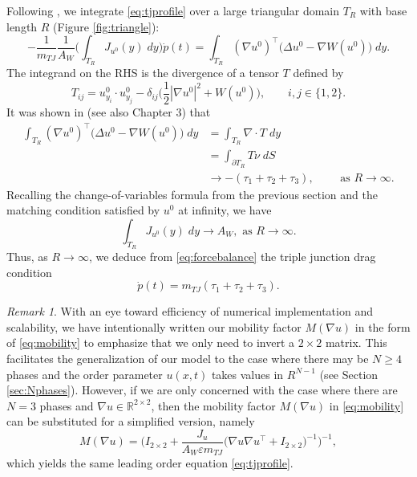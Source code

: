 \documentclass{article}
\theoremstyle{plain}
\theoremstyle{definition}
\theoremstyle{remark}
\newtheorem{remark}[theorem]{Remark}
\newcommand{\R}{\mathbb{R}}
\newcommand{\eps}{\varepsilon}
\begin{document}
Following \cite{bronsardreitich}, we integrate \eqref{eq:tjprofile} over a large triangular domain $T_R$ with base length $R$ (Figure \ref{fig:triangle}):
\begin{equation}\label{eq:forcebalance}
     -\frac{1}{m_{TJ}}\frac{1}{A_W}\bigg(\int_{T_R} J_{u^0}(y)\;dy\bigg) \dot{p}(t) = \int_{T_R}(\nabla u^0)^\top \big(\Delta u^0 - \nabla W(u^0)\big) \; dy.
\end{equation}
The integrand on the RHS is the divergence of a tensor $T$ defined by
\begin{equation}
    T_{ij} = u^0_{y_i} \cdot u^0_{y_j} - \delta_{ij}\bigg(\frac{1}{2}|\nabla u^0|^2 + W(u^0)\bigg), \qquad i,j \in \{1,2\}.
\end{equation}
It was shown in \cite{bronsardreitich} (see also \cite{alikakos2018elliptic} Chapter 3) that 
\begin{equation}
\begin{split}
    \int_{T_R}(\nabla u^0)^\top \big(\Delta u^0 - \nabla W(u^0)\big) \; dy &= \int_{T_R} \nabla\cdot T \; dy \\
    &= \int_{\partial T_R} T\nu \; dS\\
    &\to -(\tau_1 + \tau_2 + \tau_3) , \qquad \text{ as }R \to \infty.
\end{split}
\end{equation}
Recalling the change-of-variables formula from the previous section and the matching condition satisfied by $u^0$ at infinity, we have
\begin{equation}
    \int_{T_R} J_{u^0}(y)\;dy \to A_W, \text{ as } R\to\infty.
\end{equation}
Thus, as $R \to \infty$, we deduce from \eqref{eq:forcebalance} the triple junction drag condition
\begin{equation}
    \dot{p}(t) = m_{TJ}(\tau_1 + \tau_2 + \tau_3).
\end{equation}



\begin{remark}
    With an eye toward efficiency of numerical implementation and scalability, we have intentionally written our mobility factor $M(\nabla u)$ in the form of \eqref{eq:mobility} to emphasize that we only need to invert a $2\times 2$ matrix. This facilitates the generalization of our model to the case where there may be $N\geq 4$ phases and the order parameter $u(x,t)$ takes values in $R^{N-1}$ (see Section \ref{sec:Nphases}). However, if we are only concerned with the case where there are $N=3$ phases and $\nabla u \in \R^{2\times 2}$, then the mobility factor $M(\nabla u)$ in \eqref{eq:mobility} can be substituted for a simplified version, namely
\begin{equation}\label{eq:simplifiedmob}
    M(\nabla u) = \bigg(I_{2\times 2} + \dfrac{J_u}{A_W \eps m_{TJ}} \big(\nabla u \nabla u^\top + I_{2\times 2}\big)^{-1} \bigg)^{-1},
\end{equation}
which yields the same leading order equation \eqref{eq:tjprofile}.
\end{remark}
\end{document}
